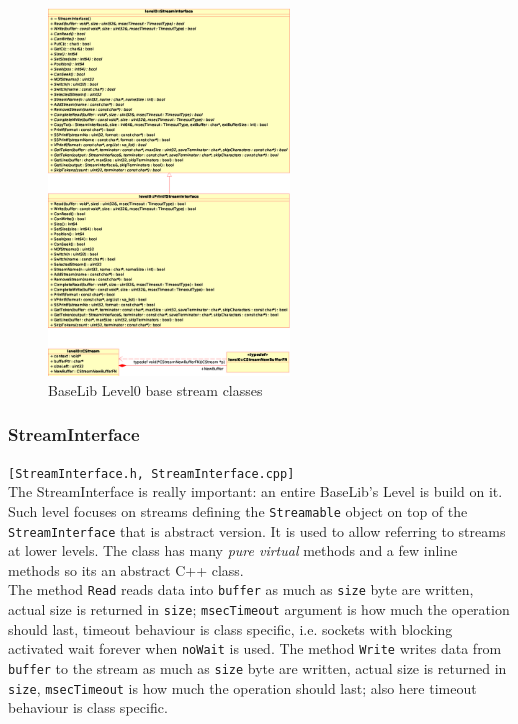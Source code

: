 \begin{figure}[h!]
 \begin{center}
  \includegraphics[width=0.57\textwidth]{level0/level0-stream.eps}
  \caption{BaseLib Level0 base stream classes}
  \label{f:level0:stream}
 \end{center}
\end{figure}



\subsubsection{StreamInterface}
\texttt{[StreamInterface.h, StreamInterface.cpp]}\\
The StreamInterface is really important: an entire BaseLib's Level is build on it. Such level focuses on streams defining the \texttt{Streamable} object on top of the \texttt{StreamInterface} that is abstract version. It is used to allow referring to streams at lower levels.
The class has many \textit{pure virtual} methods and a few inline methods so its an abstract C++ class.\\


The method \texttt{Read} reads data into \texttt{buffer} as much as \texttt{size} byte are written, actual size is returned in \texttt{size}; \texttt{msecTimeout} argument is how much the operation should last, timeout behaviour is class specific, i.e. sockets with blocking activated wait forever when \texttt{noWait} is used.
The method \texttt{Write} writes data from \texttt{buffer} to the stream as much as \texttt{size} byte are written, actual size is returned in \texttt{size}, \texttt{msecTimeout} is how much the operation should last; also here timeout behaviour is class specific.

